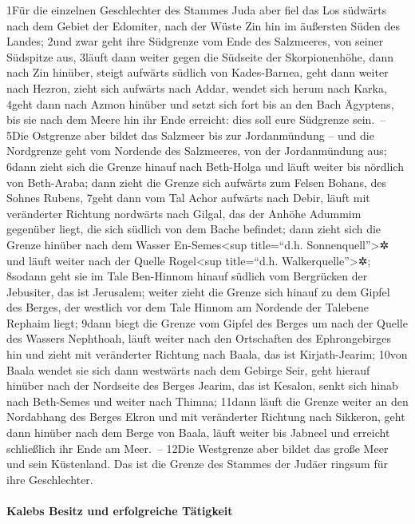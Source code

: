 1Für die einzelnen Geschlechter des Stammes Juda aber fiel das Los
südwärts nach dem Gebiet der Edomiter, nach der Wüste Zin hin im
äußersten Süden des Landes; 2und zwar geht ihre Südgrenze vom Ende des
Salzmeeres, von seiner Südspitze aus, 3läuft dann weiter gegen die
Südseite der Skorpionenhöhe, dann nach Zin hinüber, steigt aufwärts
südlich von Kades-Barnea, geht dann weiter nach Hezron, zieht sich
aufwärts nach Addar, wendet sich herum nach Karka, 4geht dann nach Azmon
hinüber und setzt sich fort bis an den Bach Ägyptens, bis sie nach dem
Meere hin ihr Ende erreicht: dies soll eure Südgrenze sein.~-- 5Die
Ostgrenze aber bildet das Salzmeer bis zur Jordanmündung -- und die
Nordgrenze geht vom Nordende des Salzmeeres, von der Jordanmündung aus;
6dann zieht sich die Grenze hinauf nach Beth-Holga und läuft weiter bis
nördlich von Beth-Araba; dann zieht die Grenze sich aufwärts zum Felsen
Bohans, des Sohnes Rubens, 7geht dann vom Tal Achor aufwärts nach Debir,
läuft mit veränderter Richtung nordwärts nach Gilgal, das der Anhöhe
Adummim gegenüber liegt, die sich südlich von dem Bache befindet; dann
zieht sich die Grenze hinüber nach dem Wasser En-Semes\textless sup
title=``d.h. Sonnenquell''\textgreater✲ und läuft weiter nach der Quelle
Rogel\textless sup title=``d.h. Walkerquelle''\textgreater✲; 8sodann
geht sie im Tale Ben-Hinnom hinauf südlich vom Bergrücken der Jebusiter,
das ist Jerusalem; weiter zieht die Grenze sich hinauf zu dem Gipfel des
Berges, der westlich vor dem Tale Hinnom am Nordende der Talebene
Rephaim liegt; 9dann biegt die Grenze vom Gipfel des Berges um nach der
Quelle des Wassers Nephthoah, läuft weiter nach den Ortschaften des
Ephrongebirges hin und zieht mit veränderter Richtung nach Baala, das
ist Kirjath-Jearim; 10von Baala wendet sie sich dann westwärts nach dem
Gebirge Seir, geht hierauf hinüber nach der Nordseite des Berges Jearim,
das ist Kesalon, senkt sich hinab nach Beth-Semes und weiter nach
Thimna; 11dann läuft die Grenze weiter an den Nordabhang des Berges
Ekron und mit veränderter Richtung nach Sikkeron, geht dann hinüber nach
dem Berge von Baala, läuft weiter bis Jabneel und erreicht schließlich
ihr Ende am Meer.~-- 12Die Westgrenze aber bildet das große Meer und
sein Küstenland. Das ist die Grenze des Stammes der Judäer ringsum für
ihre Geschlechter.

\hypertarget{kalebs-besitz-und-erfolgreiche-tuxe4tigkeit}{%
\paragraph{Kalebs Besitz und erfolgreiche
Tätigkeit}\label{kalebs-besitz-und-erfolgreiche-tuxe4tigkeit}}

